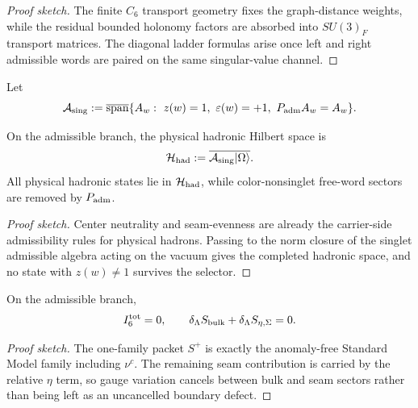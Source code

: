 \begin{proof}[Proof sketch]
The finite $C_6$ transport geometry fixes the graph-distance weights, while the residual bounded holonomy factors are absorbed into $SU(3)_F$ transport matrices. The diagonal ladder formulas arise once left and right admissible words are paired on the same singular-value channel.
\end{proof}

\begin{definition}
Let
\[
\mathcal A_{\mathrm{sing}}
:=
\overline{\mathrm{span}}\{A_w:\ z(w)=1,\ \varepsilon(w)=+1,\ P_{\mathrm{adm}} A_w=A_w\}.
\]
\end{definition}

\begin{theorem}
On the admissible branch, the physical hadronic Hilbert space is
\[
\mathcal H_{\mathrm{had}}:=\overline{\mathcal A_{\mathrm{sing}}|\Omega\rangle}.
\]
All physical hadronic states lie in $\mathcal H_{\mathrm{had}}$, while color-nonsinglet free-word sectors are removed by $P_{\mathrm{adm}}$.
\end{theorem}

\begin{proof}[Proof sketch]
Center neutrality and seam-evenness are already the carrier-side admissibility rules for physical hadrons. Passing to the norm closure of the singlet admissible algebra acting on the vacuum gives the completed hadronic space, and no state with $z(w)\neq 1$ survives the selector.
\end{proof}

\begin{theorem}
On the admissible branch,
\[
I_6^{\mathrm{tot}}=0,
\qquad
\delta_\Lambda S_{\mathrm{bulk}}+\delta_\Lambda S_{\eta,\Sigma}=0.
\]
\end{theorem}

\begin{proof}[Proof sketch]
The one-family packet $S^+$ is exactly the anomaly-free Standard Model family including $\nu^c$. The remaining seam contribution is carried by the relative $\eta$ term, so gauge variation cancels between bulk and seam sectors rather than being left as an uncancelled boundary defect.
\end{proof}
